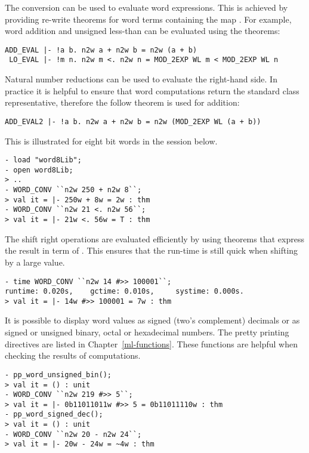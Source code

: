 The conversion  can be used to evaluate word expressions.  This is achieved by providing re-write theorems for word terms containing the map .  For example, word addition and unsigned less-than can be evaluated using the theorems:

\begin{hol}\begin{verbatim}
ADD_EVAL |- !a b. n2w a + n2w b = n2w (a + b)
 LO_EVAL |- !m n. n2w m <. n2w n = MOD_2EXP WL m < MOD_2EXP WL n
\end{verbatim}\end{hol}

\noindent Natural number reductions can be used to evaluate the right-hand side.  In practice it is helpful to ensure that word computations return the standard class representative, therefore the follow theorem is used for addition:

\begin{hol}\begin{verbatim}
ADD_EVAL2 |- !a b. n2w a + n2w b = n2w (MOD_2EXP WL (a + b))
\end{verbatim}\end{hol}

\noindent This is illustrated for eight bit words in the session below.

\setcounter{sessioncount}{0}
\begin{session}\begin{verbatim}
- load "word8Lib";
- open word8Lib;
> ..
- WORD_CONV ``n2w 250 + n2w 8``;
> val it = |- 250w + 8w = 2w : thm
- WORD_CONV ``n2w 21 <. n2w 56``;
> val it = |- 21w <. 56w = T : thm
\end{verbatim}\end{session}

The shift right operations are evaluated efficiently by using theorems that express the result in term of .  This ensures that the run-time is still quick when shifting by a large value.

\begin{session}\begin{verbatim}
- time WORD_CONV ``n2w 14 #>> 100001``;
runtime: 0.020s,    gctime: 0.010s,     systime: 0.000s.
> val it = |- 14w #>> 100001 = 7w : thm
\end{verbatim}\end{session}

It is possible to display word values as signed (two's complement) decimals or as signed or unsigned binary, octal or hexadecimal numbers.  The pretty printing directives are listed in Chapter~\ref{ml-functions}.  These functions are helpful when checking the results of computations.
\begin{session}\begin{verbatim}
- pp_word_unsigned_bin();
> val it = () : unit
- WORD_CONV ``n2w 219 #>> 5``;
> val it = |- 0b11011011w #>> 5 = 0b11011110w : thm
- pp_word_signed_dec();
> val it = () : unit
- WORD_CONV ``n2w 20 - n2w 24``;
> val it = |- 20w - 24w = ~4w : thm
\end{verbatim}\end{session}

